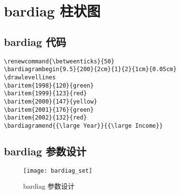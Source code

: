\section{bardiag 柱状图}
\subsection{bardiag 代码}
\renewcommand{\betweenticks}{50}
\drawlevellines
{}

\begin{lstlisting}
\renewcommand{\betweenticks}{50}
\bardiagrambegin{9.5}{200}{2cm}{1}{2}{1cm}{0.05cm}
\drawlevellines
\baritem{1998}{120}{green}
\baritem{1999}{123}{red}
\baritem{2000}{147}{yellow}
\baritem{2001}{176}{green}
\baritem{2002}{132}{red}
\bardiagramend{{\large Year}}{{\large Income}}
\end{lstlisting}

\subsection{bardiag 参数设计}
\begin{figure}[H]
  \centering
  \texttt{[image: bardiag\_set]}\\
  \caption{bardiag 参数设计}\label{bardiag_set}
\end{figure}
